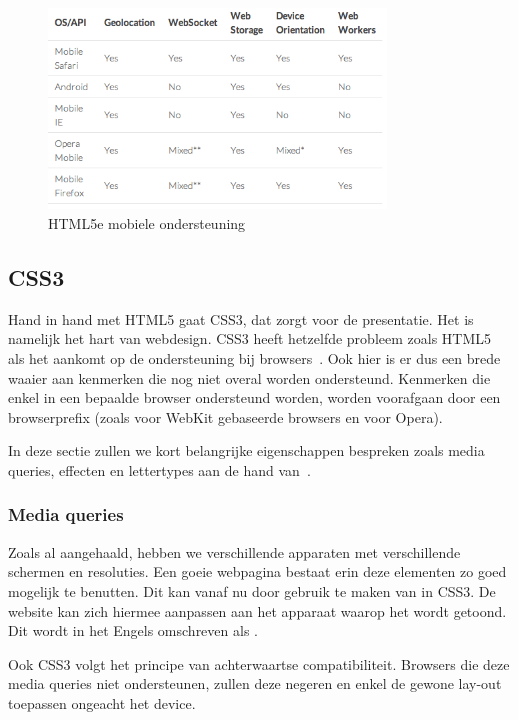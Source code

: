 \begin{figure}
  \centering
  \includegraphics[width=0.8\textwidth]{figuren/html5e}
  \caption{HTML5e mobiele ondersteuning~\cite{Hales2012}}
  \label{fig:html5e}
\end{figure}

\subsection{CSS3}
\label{ref:css3}
Hand in hand met HTML5 gaat CSS3, dat zorgt voor de presentatie. Het is namelijk het hart van webdesign. CSS3 heeft hetzelfde probleem zoals HTML5 als het aankomt op de ondersteuning bij browsers~\cite{MacDonald2011}. Ook hier is er dus een brede waaier aan kenmerken die nog niet overal worden ondersteund. Kenmerken die enkel in een bepaalde browser ondersteund worden, worden voorafgaan door een browserprefix (zoals  voor WebKit gebaseerde browsers en  voor Opera).

In deze sectie zullen we kort belangrijke eigenschappen bespreken zoals media queries, effecten en lettertypes aan de hand van~\cite{MacDonald2011}.

\subsubsection{Media queries}
Zoals al aangehaald, hebben we verschillende apparaten met verschillende schermen en resoluties. Een goeie webpagina bestaat erin deze elementen zo goed mogelijk te benutten. Dit kan vanaf nu door gebruik te maken van  in CSS3. De website kan zich hiermee aanpassen aan het apparaat waarop het wordt getoond. Dit wordt in het Engels omschreven als .

Ook CSS3 volgt het principe van achterwaartse compatibiliteit. Browsers die deze media queries niet ondersteunen, zullen deze negeren en enkel de gewone lay-out toepassen ongeacht het device.

